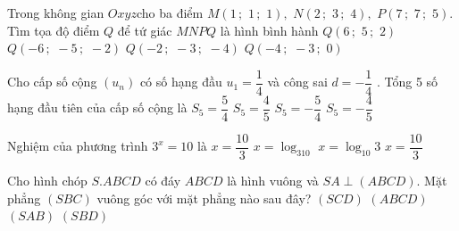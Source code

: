 \begin{ex}%
	Trong không gian $ Oxyz$cho ba điểm $ M\left(1\,;\,\,1\,;\,\,1\right),\,\,N\left(2\,;\,\,3\,;\,\,4\right),\,\,P\left(7\,;\,\,7\,;\,\,5\right)$. Tìm tọa độ điểm $ Q$ để tứ giác $ MNPQ$ là hình bình hành
	\choice
	{\True $ Q\left(6\,;\,\,5\,;\,\,2\right)$}
	{$ Q\left(-6\,;\,\,-5\,;\,\,-2\right)$}
	{$ Q\left(-2\,;\,\,-3\,;\,\,-4\right)$}
	{$Q\left(-4\,;\,\,-3\,;\,\,0\right)$}
\end{ex}
\begin{ex}%
	Cho cấp số cộng $\left(u_n\right)$ có số hạng đầu $u_1=\dfrac{1}{4}$ và công sai $d=-\dfrac{1}{4}$ . Tổng 5 số hạng đầu tiên của cấp số cộng là
	\choice
	{$S_5=\dfrac{5}{4}$}
	{$S_5=\dfrac{4}{5}$}
	{\True $S_5=-\dfrac{5}{4}$}
	{$S_5=-\dfrac{4}{5}$}
\end{ex}
\begin{ex}%
	Nghiệm của phương trình $3^x=10$ là
	\choice
	{$ x=\dfrac{10}{3}$}
	{\True $ x=\log_310$}
	{$ x=\log_{10}3$}
	{$ x=\dfrac{10}{3}$}
\end{ex}
\begin{ex}%
	Cho hình chóp $ S.ABCD$ có đáy $ ABCD$ là hình vuông và $ SA\perp\left(ABCD\right)$. Mặt phẳng $\left(SBC\right)$ vuông góc với mặt phẳng nào sau đây?
	\choice
	{$\left(SCD\right)$}
	{$\left(ABCD\right)$}
	{\True $\left(SAB\right)$}
	{$\left(SBD\right)$}
\end{ex}

